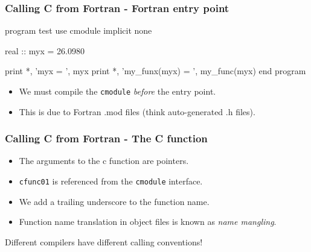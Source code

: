 \documentclass[table]{beamer}
\newif\ifschigh\schighfalse
\newcommand{\kw}[1]{\ifschigh\textcolor{red}{#1}\else\textcolor{keyword}{#1}\fi}
\newcommand{\kt}[1]{\ifschigh\textcolor{red}{#1}\else\textcolor{ctext}{#1}\fi}
\begin{document}
\begin{frame}[fragile]
\frametitle{Calling C from Fortran - Fortran entry point}
\begin{semiverbatim}
\small
\kw{program} test
   \kw{use} cmodule
   \kw{implicit none}
   
   \kw{real} :: myx = 26.0980
   
   print *, \kt{'myx = '}, myx
   print *, \kt{'my_funx(myx) = '}, my_func(myx)
\kw{end program}
\end{semiverbatim}
\begin{itemize}
\item We must compile the {\tt cmodule} \emph{before} the entry point.
\item This is due to Fortran .mod files (think auto-generated .h files).
\end{itemize}
\end{frame}

\begin{frame}[fragile]
\frametitle{Calling C from Fortran - The C function}
\begin{itemize}
\item The arguments to the c function are pointers.
\item {\tt cfunc01} is referenced from the {\tt cmodule} interface.
\item We add a trailing underscore to the function name.
\item Function name translation in object files is known as \emph{name mangling}.
\end{itemize}
\begin{alertblock}{}
\begin{center}
Different compilers have different calling conventions!
\end{center}
\end{alertblock}
\end{frame}
\end{document}

